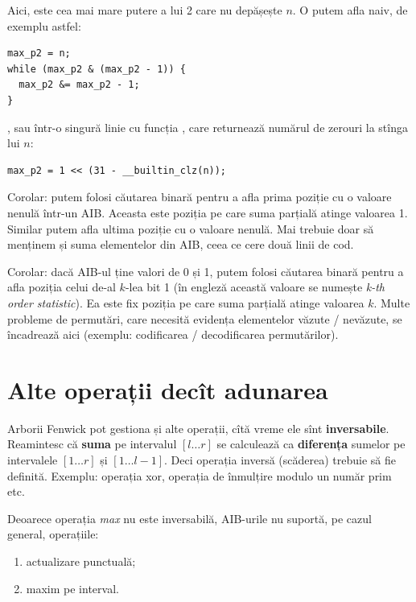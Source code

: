 \documentclass[../main.tex]{subfiles}
\begin{document}
Aici,  este cea mai mare putere a lui 2 care nu depășește $n$. O putem afla naiv, de exemplu astfel:

\begin{verbatim}
max_p2 = n;
while (max_p2 & (max_p2 - 1)) {
  max_p2 &= max_p2 - 1;
}
\end{verbatim}

, sau într-o singură linie cu funcția , care returnează numărul de zerouri la stînga lui $n$:

\begin{verbatim}
max_p2 = 1 << (31 - __builtin_clz(n));
\end{verbatim}

Corolar: putem folosi căutarea binară pentru a afla prima poziție cu o valoare nenulă într-un AIB. Aceasta este poziția pe care suma parțială atinge valoarea 1. Similar putem afla ultima poziție cu o valoare nenulă. Mai trebuie doar să menținem și suma elementelor din AIB, ceea ce cere două linii de cod.

Corolar: dacă AIB-ul ține valori de 0 și 1, putem folosi căutarea binară pentru a afla poziția celui de-al $k$-lea bit 1 (în engleză această valoare se numește \textit{k-th order statistic}). Ea este fix poziția pe care suma parțială atinge valoarea $k$. Multe probleme de permutări, care necesită evidența elementelor văzute / nevăzute, se încadrează aici (exemplu: codificarea / decodificarea permutărilor).

\section{Alte operații decît adunarea}

Arborii Fenwick pot gestiona și alte operații, cîtă vreme ele sînt \textbf{inversabile}. Reamintesc că \textbf{suma} pe intervalul $[l \dots r]$ se calculează ca \textbf{diferența} sumelor pe intervalele $[1 \dots r]$ și $[1 \dots l-1]$. Deci operația inversă (scăderea) trebuie să fie definită. Exemplu: operația xor, operația de înmulțire modulo un număr prim etc.

Deoarece operația \textit{max} nu este inversabilă, AIB-urile nu suportă, pe cazul general, operațiile:

\begin{enumerate}
  \item actualizare punctuală;
  \item maxim pe interval.
\end{enumerate}
\end{document}
